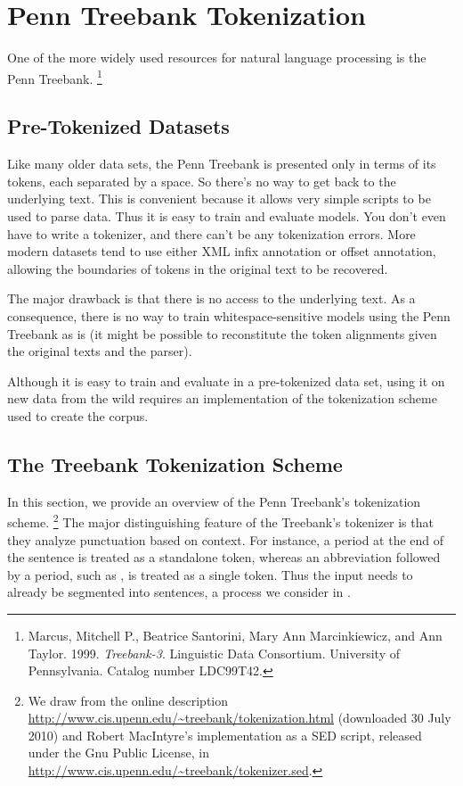 \section{Penn Treebank Tokenization}

One of the more widely used resources for natural language
processing is the Penn Treebank.%
%
\footnote{Marcus, Mitchell P., Beatrice Santorini, Mary Ann
  Marcinkiewicz, and Ann Taylor. 1999. {\it Treebank-3}. Linguistic
  Data Consortium.  University of Pennsylvania.  Catalog number
  LDC99T42.}
%

\subsection{Pre-Tokenized Datasets}

Like many older data sets, the Penn Treebank is presented only in
terms of its tokens, each separated by a space.  So there's no way to
get back to the underlying text.  This is convenient because it allows
very simple scripts to be used to parse data.  Thus it is easy to
train and evaluate models.  You don't even have to write a tokenizer,
and there can't be any tokenization errors.  More modern datasets tend
to use either XML infix annotation or offset annotation, allowing the
boundaries of tokens in the original text to be recovered.

The major drawback is that there is no access to the underlying text.
As a consequence, there is no way to train whitespace-sensitive models
using the Penn Treebank as is (it might be possible to reconstitute
the token alignments given the original texts and the parser).

Although it is easy to train and evaluate in a pre-tokenized data
set, using it on new data from the wild requires an implementation
of the tokenization scheme used to create the corpus.

\subsection{The Treebank Tokenization Scheme}

In this section, we provide an overview of the Penn Treebank's
tokenization scheme.%
%
\footnote{We draw from the online description
  \url{http://www.cis.upenn.edu/~treebank/tokenization.html}
  (downloaded 30 July 2010) and Robert MacIntyre's implementation as
  a SED script, released under the Gnu Public License, in
  \url{http://www.cis.upenn.edu/~treebank/tokenizer.sed}.}
%
The major distinguishing feature of the Treebank's tokenizer is that
they analyze punctuation based on context.  For instance, a period at
the end of the sentence is treated as a standalone token, whereas an
abbreviation followed by a period, such as , is
treated as a single token.  Thus the input needs to already be
segmented into sentences, a process we consider in
.

